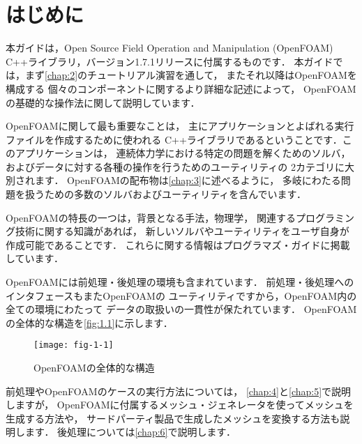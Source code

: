 \chapter{はじめに}
\label{chap:1}
本ガイドは，Open Source Field Operation and Manipulation
(OpenFOAM) C++ライブラリ，バージョン1.7.1リリースに付属するものです．
本ガイドでは，まず\autoref{chap:2}のチュートリアル演習を通して，
またそれ以降はOpenFOAMを構成する
個々のコンポーネントに関するより詳細な記述によって，
OpenFOAMの基礎的な操作法に関して説明しています．

OpenFOAMに関して最も重要なことは，
主にアプリケーションとよばれる実行ファイルを作成するために使われる
C++ライブラリであるということです．このアプリケーションは，
連続体力学における特定の問題を解くためのソルバ，
およびデータに対する各種の操作を行うためのユーティリティの
2カテゴリに大別されます．
OpenFOAMの配布物は\autoref{chap:3}に述べるように，
多岐にわたる問題を扱うための多数のソルバおよびユーティリティを含んでいます．

OpenFOAMの特長の一つは，背景となる手法，物理学，
関連するプログラミング技術に関する知識があれば，
新しいソルバやユーティリティをユーザ自身が作成可能であることです．
これらに関する情報はプログラマズ・ガイドに掲載しています．

OpenFOAMには前処理・後処理の環境も含まれています．
前処理・後処理へのインタフェースもまたOpenFOAMの
ユーティリティですから，OpenFOAM内の全ての環境にわたって
データの取扱いの一貫性が保たれています．
OpenFOAMの全体的な構造を\autoref{fig:1.1}に示します．


\begin{figure}[ht]
 \texttt{[image: fig-1-1]}
 \caption{OpenFOAMの全体的な構造}
 \label{fig:1.1}
\end{figure}


前処理やOpenFOAMのケースの実行方法については，
\autoref{chap:4}と\autoref{chap:5}で説明しますが，
OpenFOAMに付属するメッシュ・ジェネレータを使ってメッシュを生成する方法や，
サードパーティ製品で生成したメッシュを変換する方法も説明します．
後処理については\autoref{chap:6}で説明します．


